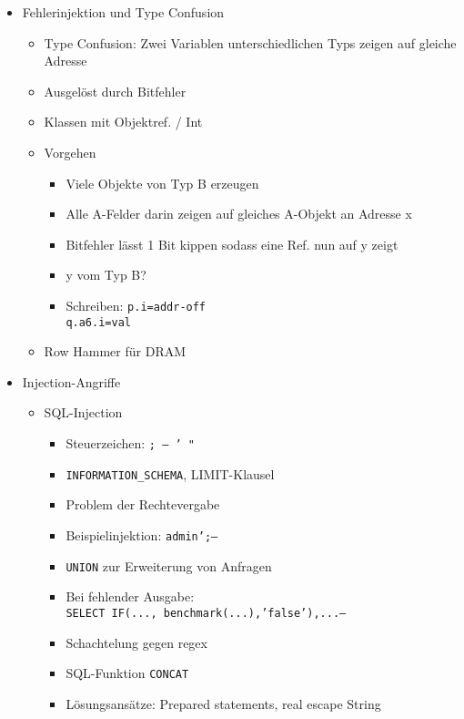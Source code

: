 \documentclass[11pt, paper=a4, twocolumn]{scrartcl}
\begin{document}
\begin{itemize}
		\item Fehlerinjektion und Type Confusion
			\begin{itemize}
				\item Type Confusion: Zwei Variablen unterschiedlichen 
					Typs zeigen auf gleiche Adresse
				\item Ausgelöst durch Bitfehler
				\item Klassen mit Objektref. / Int
				\item Vorgehen
					\begin{itemize}
						\item Viele Objekte von Typ B erzeugen
						\item Alle A-Felder darin zeigen auf 
							gleiches A-Objekt an Adresse x
						\item Bitfehler lässt 1 Bit kippen sodass 
							eine Ref. nun auf y zeigt
						\item y vom Typ B?
						\item Schreiben: \texttt{p.i=addr-off}\\
							\texttt{q.a6.i=val}
					\end{itemize}
				\item Row Hammer für DRAM
			\end{itemize}

		\item Injection-Angriffe
			\begin{itemize}
				\item SQL-Injection
					\begin{itemize}
						\item Steuerzeichen: \texttt{; -- ' "}
						\item \texttt{INFORMATION\_SCHEMA}, 
							LIMIT-Klausel
						\item Problem der Rechtevergabe
						\item Beispielinjektion: 
							\texttt{admin';--}
						\item \texttt{UNION} zur Erweiterung von 
							Anfragen
						\item Bei fehlender Ausgabe:\\ 
							\texttt{SELECT IF(..., 
							benchmark(...),'false'),...-- }
						\item Schachtelung gegen regex
						\item SQL-Funktion \texttt{CONCAT}
						\item Lösungsansätze: Prepared statements, 
							real escape String
					\end{itemize}


\end{itemize}
\end{itemize}
\end{document}
